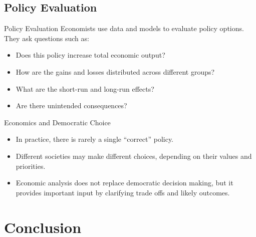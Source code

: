 \documentclass[aspectratio=169]{beamer}
\begin{document}
\subsection{Policy Evaluation}

\begin{frame}{Policy Evaluation}
  \transfade
  Economists use data and models to evaluate policy options. They ask questions such as:
  \begin{itemize}[<+->]
    \item Does this policy increase total economic output?
    \item How are the gains and losses distributed across different groups?
    \item What are the short-run and long-run effects?
    \item Are there unintended consequences?
  \end{itemize}
\end{frame}

\begin{frame}{Economics and Democratic Choice}
  \transfade
  \begin{itemize}[<+->]
    \item In practice, there is rarely a single ``correct'' policy.
    \item Different societies may make different choices, depending on their values and priorities.
    \item Economic analysis does not replace democratic decision making, but it provides important
    input by clarifying trade offs and likely outcomes.
  \end{itemize}
\end{frame}

\section{Conclusion}
\end{document}
